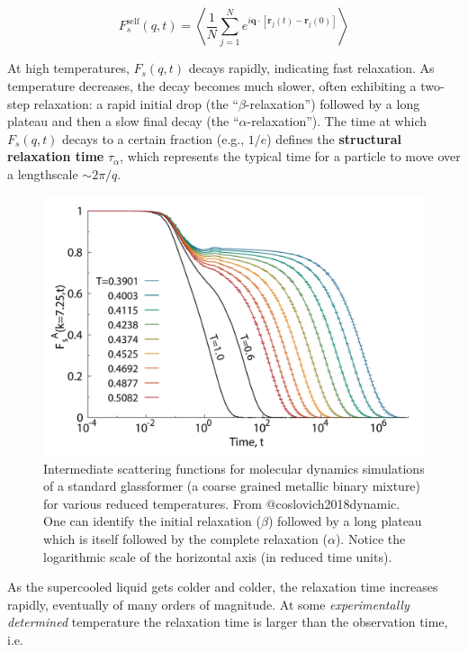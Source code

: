 \documentclass[
  letterpaper,
  enabledeprecatedfontcommands]{report}
\begin{document}
\[
F_s^{\text{self}}(q, t) = \left\langle \frac{1}{N} \sum_{j=1}^N e^{i \mathbf{q} \cdot [\mathbf{r}_j(t) - \mathbf{r}_j(0)]} \right\rangle
\]

At high temperatures, \(F_s(q, t)\) decays rapidly, indicating fast
relaxation. As temperature decreases, the decay becomes much slower,
often exhibiting a two-step relaxation: a rapid initial drop (the
``\(\beta\)-relaxation'') followed by a long plateau and then a slow
final decay (the ``\(\alpha\)-relaxation''). The time at which
\(F_s(q, t)\) decays to a certain fraction (e.g., \(1/e\)) defines the
\textbf{structural relaxation time} \(\tau_\alpha\), which represents
the typical time for a particle to move over a lengthscale
\(\sim 2\pi/q\).

\begin{figure}[H]

{\centering \includegraphics[width=0.8\linewidth,height=\textheight,keepaspectratio]{soft-matter/./figs/fskt.png}

}

\caption{Intermediate scattering functions for molecular dynamics
simulations of a standard glassformer (a coarse grained metallic binary
mixture) for various reduced temperatures. From @coslovich2018dynamic.
One can identify the initial relaxation (\(\beta\)) followed by a long
plateau which is itself followed by the complete relaxation
(\(\alpha\)). Notice the logarithmic scale of the horizontal axis (in
reduced time units).}

\end{figure}%

As the supercooled liquid gets colder and colder, the relaxation time
increases rapidly, eventually of many orders of magnitude. At some
\emph{experimentally determined} temperature the relaxation time is
larger than the observation time, i.e.
\end{document}

